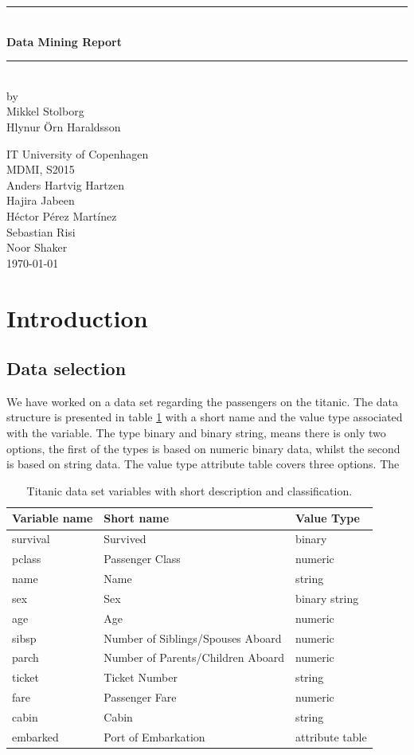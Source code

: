 \documentclass[a4paper,11pt]{article}
\begin{document}
\begin{titlepage}

\centering \parindent=0pt
\newcommand{\HRule}{\rule{\textwidth}{1mm}}
 \HRule\\[1cm]\Huge\bfseries
Data Mining Report\\[0.7cm]
\HRule\\[4cm]  
\large by 
\\ Mikkel Stolborg
\\ Hlynur Örn Haraldsson
 \normalsize %
\begin{flushleft}
IT University of Copenhagen \\
MDMI, S2015\\
Anders Hartvig Hartzen\\
Hajira Jabeen\\
Héctor Pérez Martínez\\
Sebastian Risi\\
Noor Shaker\\
\today \end{flushleft}
\end{titlepage}

\tableofcontents
\pagebreak
\section{Introduction}
\subsection{Data selection}
We have worked on a data set regarding the passengers on the titanic. The data structure is presented in table \ref{titanData} with a short name and the value type associated with the variable. 
The type binary and binary string, means there is only two options, the first of the types is based on numeric binary data, whilst the second is based on string data. The value type attribute table covers three options. The 
\begin{table}[h]
\begin{tabular}{|l|l|l|}
\hline
Variable name & Short name & Value Type\\
\hline
survival & Survived & binary\\
pclass & Passenger Class & numeric\\
name & Name & string\\
sex & Sex & binary string\\
age & Age & numeric\\
sibsp & Number of Siblings/Spouses Aboard & numeric\\
parch & Number of Parents/Children Aboard & numeric\\
ticket & Ticket Number & string\\
fare & Passenger Fare & numeric\\
cabin & Cabin & string\\
embarked & Port of Embarkation & attribute table\\
\hline
\end{tabular}
\caption{Titanic data set variables with short description and classification.}
\label{titanData}
\end{table}
\end{document}
